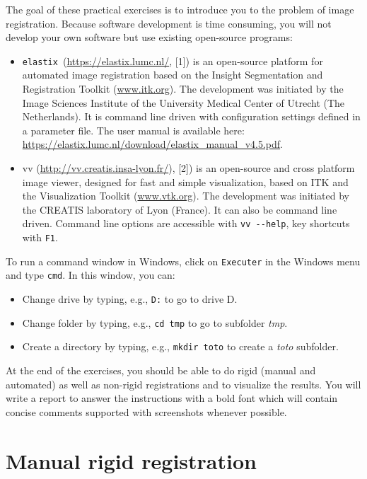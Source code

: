 \documentclass[]{report}
\newcommand{\elastix}{\texttt{elastix}}
\begin{document}
The goal of these practical exercises is to introduce you to the problem of
image registration. Because software development is time consuming, you will
not develop your own software but use existing open-source programs:
\begin{itemize}
\item \elastix\ (\url{https://elastix.lumc.nl/}, [1]) is an open-source
    platform for automated image registration based on the Insight
    Segmentation and Registration Toolkit (\url{www.itk.org}). The
    development was initiated by the Image Sciences Institute of the
    University Medical Center of Utrecht (The Netherlands). It is command
    line driven with configuration settings defined in a parameter file.
    The user manual is available here:
    \url{https://elastix.lumc.nl/download/elastix_manual_v4.5.pdf}.
\item vv (\url{http://vv.creatis.insa-lyon.fr/}), [2]) is an open-source
    and cross platform image viewer, designed for fast and simple
    visualization, based on ITK and the Visualization Toolkit
    (\url{www.vtk.org}). The development was initiated by the CREATIS
    laboratory of Lyon (France). It can also be command line driven.
    Command line options are accessible with \verb+vv --help+, key
    shortcuts with \verb+F1+.
\end{itemize}

To run a command window in Windows, click on \verb+Executer+ in the Windows
menu and type \verb+cmd+. In this window, you can:
\begin{itemize}
    \item Change drive by typing, e.g., \verb+D:+ to go to drive D.
    \item Change folder by typing, e.g., \verb+cd tmp+ to go to subfolder
\textit{tmp}.
    \item Create a directory by typing, e.g., \verb+mkdir toto+ to create a
\textit{toto} subfolder.
\end{itemize}

At the end of the exercises, you should be able to do rigid (manual and
automated) as well as non-rigid registrations and to visualize the results. You
will write a report to answer the instructions with a bold font which will
contain concise comments supported with screenshots whenever possible.

\section{Manual rigid registration}
\end{document}
